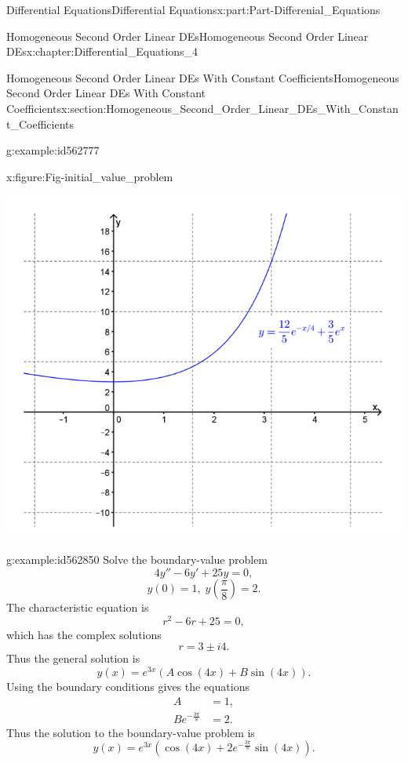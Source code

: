 \documentclass[oneside,10pt,]{book}
\numberwithin{equation}{section}
\newcommand{\amp}{&}
\begin{document}
\begin{partptx}{Differential Equations}{}{Differential Equations}{}{}{x:part:Part-Differenial_Equations}
\begin{chapterptx}{Homogeneous Second Order Linear DEs}{}{Homogeneous Second Order Linear DEs}{}{}{x:chapter:Differential_Equations_4}
\begin{sectionptx}{Homogeneous Second Order Linear DEs With Constant Coefficients}{}{Homogeneous Second Order Linear DEs With Constant Coefficients}{}{}{x:section:Homogeneous_Second_Order_Linear_DEs_With_Constant_Coefficients}
\begin{example}{}{g:example:id562777}
\begin{figureptx}{}{x:figure:Fig-initial_value_problem}{}
\begin{image}{0.075}{0.85}{0.075}
\includegraphics[width=\linewidth]{./DifferentialEquations/Images/4/initial_value_problem.png}
\end{image}%
\tcblower
\end{figureptx}%
\end{example}
\begin{example}{}{g:example:id562850}%
Solve the boundary-value problem%
\begin{equation*}
4y''-6y'+25y=0, 
\end{equation*}
%
\begin{equation*}
y(0)=1,\;  y(\frac{\pi}{8})=2. 
\end{equation*}
The characteristic equation is%
\begin{equation*}
r^{2}-6r+25=0, 
\end{equation*}
which has the complex solutions%
\begin{equation*}
r=3\pm i 4. 
\end{equation*}
Thus the general solution is%
\begin{equation*}
y(x)=e^{3x} (A \cos(4 x) + B \sin(4 x)).
\end{equation*}
Using the boundary conditions gives the equations%
\begin{align*}
A  \amp = 1,  \\
B  e^{-\frac{3\pi}{8}} \amp = 2. 
\end{align*}
Thus the solution to the boundary-value problem is%
\begin{equation*}
y(x)=e^{3x} ( \cos(4 x) + 2 e^{-\frac{3\pi}{8}} \sin(4 x)).

\end{equation*}
\end{example}
\end{sectionptx}
\end{chapterptx}
\end{partptx}
\end{document}
